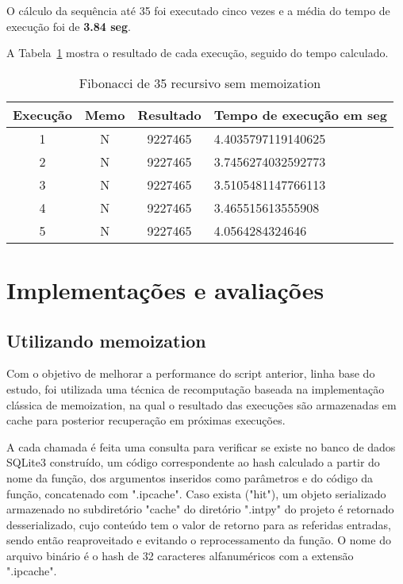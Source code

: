 \documentclass[sigconf]{acmart}
\begin{document}
O cálculo da sequência até 35 foi executado cinco vezes e a média do tempo de execução foi de \textbf{3.84 seg}.

A Tabela~\ref{tab:fibrscache} mostra o resultado de cada execução, seguido do tempo calculado.

\begin{table}[ht]
  \caption{Fibonacci de 35 recursivo sem memoization}
  \label{tab:fibrscache}
  \begin{tabular}{cccl}
    \toprule
    Execução & Memo & Resultado & Tempo de execução em seg\\
    \midrule
    1 & N & 9227465 & 4.4035797119140625\\
    2 & N & 9227465 & 3.7456274032592773\\
    3 & N & 9227465 & 3.5105481147766113\\
    4 & N & 9227465 & 3.465515613555908\\
    5 & N & 9227465 & 4.0564284324646\\
  \bottomrule
\end{tabular}
\end{table}

\section{Implementações e avaliações}
\subsection{Utilizando memoization}
Com o objetivo de melhorar a performance do script anterior, linha base do estudo, foi utilizada uma técnica de recomputação baseada na implementação clássica de memoization, na qual o resultado das execuções são armazenadas em cache para posterior recuperação em próximas execuções.

A cada chamada é feita uma consulta para verificar se existe no banco de dados SQLite3 construído, um código correspondente ao hash calculado a partir do nome da função, dos argumentos inseridos como parâmetros e do código da função, concatenado com ".ipcache". Caso exista ("hit"), um objeto serializado armazenado no subdiretório "cache" do diretório ".intpy" do projeto é retornado desserializado, cujo conteúdo tem o valor de retorno para as referidas entradas, sendo então reaproveitado e evitando o reprocessamento da função. O nome do arquivo binário é o hash de 32 caracteres alfanuméricos com a extensão ".ipcache".
\end{document}
